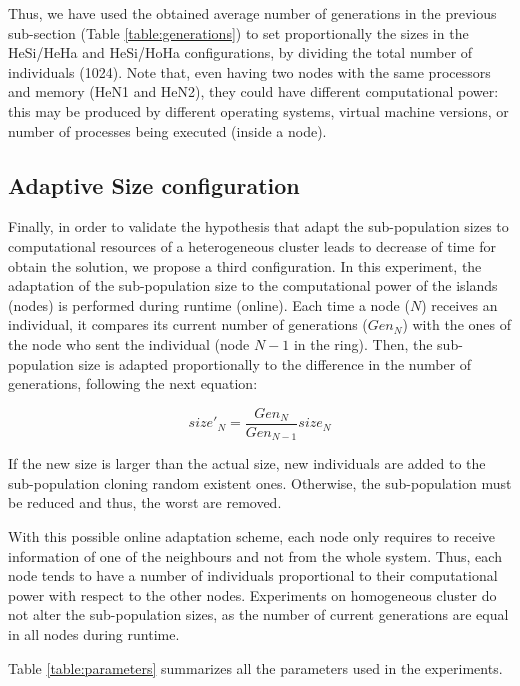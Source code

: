 Thus, we have used the obtained average number of generations in the previous sub-section (Table \ref{table:generations}) to set proportionally the sizes in the HeSi/HeHa and HeSi/HoHa configurations, by dividing the total number of individuals (1024). Note that, even having two nodes with the same processors and memory (HeN1 and HeN2), they could have different computational power: this may be produced by different operating systems, virtual machine versions, or number of processes being executed (inside a node).



\subsection{Adaptive Size configuration}

Finally, in order to validate the hypothesis that adapt the sub-population sizes to computational resources of a heterogeneous cluster leads to decrease of time for obtain the solution, we propose a third configuration. In this experiment, the adaptation of the sub-population size to the computational power of the islands (nodes) is performed during runtime (online).  Each time a node ($N$) receives an individual, it compares its current number of generations ($Gen_{N}$) with the ones of the node who sent the individual (node $N-1$ in the ring). Then, the sub-population size is adapted proportionally to the difference in the number of generations, following the next equation:

\begin{equation}
size'_{N}=\dfrac{Gen_{N}}{Gen_{N-1}}size_{N}
\end{equation}

If the new size is larger than the actual size, new individuals are added to the sub-population cloning random existent ones. Otherwise, the sub-population must be reduced and thus, the worst are removed.

With this possible online adaptation scheme, each node only requires to receive information of one of the neighbours and not from the whole system. Thus, each node tends to have a number of individuals proportional to their computational power with respect to the other nodes. Experiments on homogeneous cluster do not alter the sub-population sizes, as the number of current generations are equal in all nodes during runtime.

Table \ref{table:parameters} summarizes all the parameters used in the experiments.

